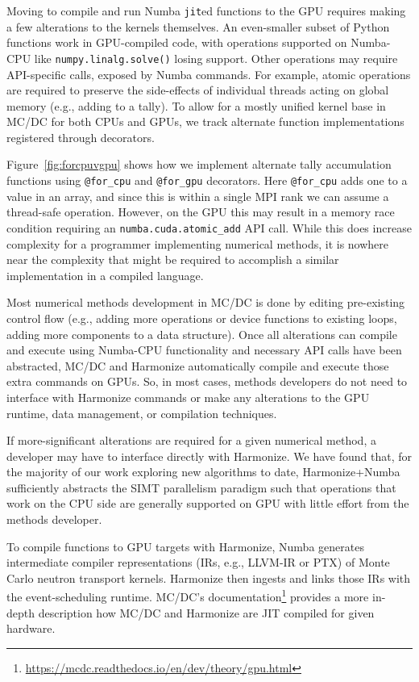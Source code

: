 

Moving to compile and run Numba \texttt{jit}ed functions to the GPU requires making a few alterations to the kernels themselves.
An even-smaller subset of Python functions work in GPU-compiled code, with operations supported on Numba-CPU like \texttt{numpy.linalg.solve()} losing support.
Other operations may require API-specific calls, exposed by Numba commands.
For example, atomic operations are required to preserve the side-effects of individual threads acting on global memory (e.g., adding to a tally).
To allow for a mostly unified kernel base in MC/DC for both CPUs and GPUs, we track alternate function implementations registered through decorators.

Figure~\ref{fig:forcpuvgpu} shows how we implement alternate tally accumulation functions using \texttt{@for\_cpu} and \texttt{@for\_gpu} decorators.
Here \texttt{@for\_cpu} adds one to a value in an array, and since this is within a single MPI rank we can assume a thread-safe operation.
However, on the GPU this may result in a memory race condition requiring an \texttt{numba.cuda.atomic\_add} API call.
While this does increase complexity for a programmer implementing numerical methods, it is nowhere near the complexity that might be required to accomplish a similar implementation in a compiled language.

Most numerical methods development in MC/DC is done by editing pre-existing control flow (e.g., adding more operations or device functions to existing loops, adding more components to a data structure).
Once all alterations can compile and execute using Numba-CPU functionality and necessary API calls have been abstracted, MC/DC and Harmonize automatically compile and execute those extra commands on GPUs.
So, in most cases, methods developers do not need to interface with Harmonize commands or make any alterations to the GPU runtime, data management, or compilation techniques.

If more-significant alterations are required for a given numerical method, a developer may have to interface directly with Harmonize.
We have found that, for the majority of our work exploring new algorithms to date, Harmonize+Numba sufficiently abstracts the SIMT parallelism paradigm such that operations that work on the CPU side are generally supported on GPU with little effort from the methods developer.

To compile functions to GPU targets with Harmonize, Numba generates intermediate compiler representations (IRs, e.g., LLVM-IR or PTX) of Monte Carlo neutron transport kernels. 
Harmonize then ingests and links those IRs with the event-scheduling runtime.
MC/DC's documentation\footnote{\url{https://mcdc.readthedocs.io/en/dev/theory/gpu.html}} provides a more in-depth description how MC/DC and Harmonize are JIT compiled for given hardware.

